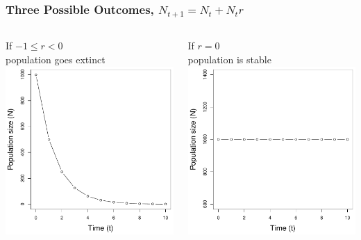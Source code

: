 \documentclass[color=usenames,dvipsnames]{beamer}\usepackage[]{graphicx}\usepackage[]{color}
\begin{document}
\begin{frame}
  \frametitle{Three Possible Outcomes, $N_{t+1} = N_t + N_tr$}
  \begin{columns}
    \begin{column}{0.33\textwidth}
      \small
      \centering
      If $-1 \leq r < 0$ \\ population goes extinct \\
      \includegraphics[width=\textwidth]{figs/rl0}
    \end{column}
    \begin{column}{0.33\textwidth}
      \small
      \centering
      If $r = 0$ \\ population is stable \\
      \includegraphics[width=\textwidth]{figs/r0}

\end{column}
\end{columns}
\end{frame}
\end{document}
